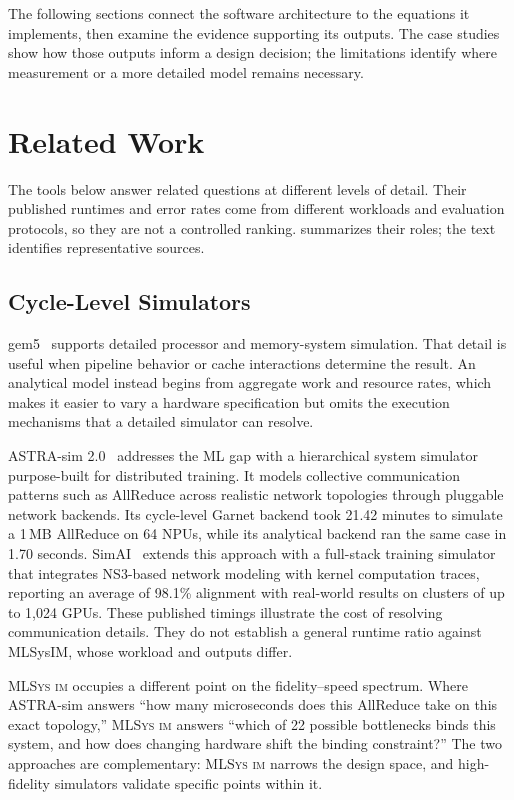 \documentclass[10pt,twocolumn]{article}
\newcommand{\mlsysim}{\mbox{\textsc{MLSys}\,\textperiodcentered\,\textsc{im}}\xspace}
\begin{document}
The following sections connect the software architecture to the equations it implements, then examine the evidence supporting its outputs. The case studies show how those outputs inform a design decision; the limitations identify where measurement or a more detailed model remains necessary.

\section{Related Work}
\label{sec:related}

The tools below answer related questions at different levels of detail. Their published runtimes and error rates come from different workloads and evaluation protocols, so they are not a controlled ranking.  summarizes their roles; the text identifies representative sources.

\subsection{Cycle-Level Simulators}

gem5~\citep{binkert2011} supports detailed processor and memory-system simulation. That detail is useful when pipeline behavior or cache interactions determine the result. An analytical model instead begins from aggregate work and resource rates, which makes it easier to vary a hardware specification but omits the execution mechanisms that a detailed simulator can resolve.

ASTRA-sim 2.0~\citep{won2023} addresses the ML gap with a hierarchical system simulator purpose-built for distributed training. It models collective communication patterns such as AllReduce across realistic network topologies through pluggable network backends. Its cycle-level Garnet backend took 21.42 minutes to simulate a 1\,MB AllReduce on 64 NPUs, while its analytical backend ran the same case in 1.70 seconds. SimAI~\citep{wang2025simai} extends this approach with a full-stack training simulator that integrates NS3-based network modeling with kernel computation traces, reporting an average of 98.1\% alignment with real-world results on clusters of up to 1{,}024 GPUs. These published timings illustrate the cost of resolving communication details. They do not establish a general runtime ratio against MLSysIM, whose workload and outputs differ.

\mlsysim occupies a different point on the fidelity--speed spectrum. Where ASTRA-sim answers ``how many microseconds does this AllReduce take on this exact topology,'' \mlsysim answers ``which of 22 possible bottlenecks binds this system, and how does changing hardware shift the binding constraint?'' The two approaches are complementary: \mlsysim narrows the design space, and high-fidelity simulators validate specific points within it.
\end{document}
